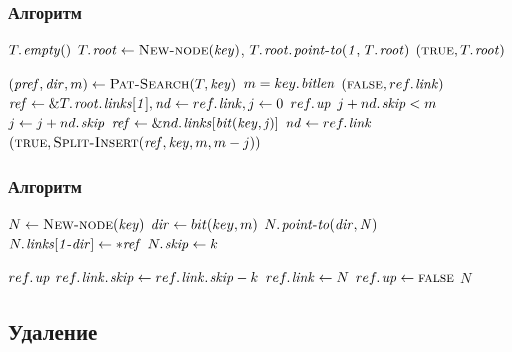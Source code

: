 \documentclass[hyperref={unicode=true}]{beamer}
\begin{document}
\frame
{
\frametitle{Алгоритм}
  \begin{codebox}
      \li \If $\attrib{T}{empty()}$
          \Then
      \li $\attrib{T}{root} \gets \proc{New-node}(\id{key})$, $\attribb{T}{root}{point-to(1, \attrib{T}{root})}$
      \li \Return $(\const{true}, \attrib{T}{root})$
          \End

      \li $(\id{pref}, \id{dir}, m) \gets \proc{Pat-Search}(T, \id{key})$
      \li \If $m \isequal \attrib{key}{bitlen}$
          \Then
      \li \Return $(\const{false}, \attrib{ref}{link})$
          \End
      \li $\id{ref} \gets \&\attribb{T}{root}{links[1]}, \id{nd} \gets \attrib{ref}{link}, j \gets 0$
      \li \While {} $\attrib{ref}{up}$  $j + \attrib{nd}{skip} < m$
            \Do
      \li       $j \gets j + \attrib{nd}{skip}$
      \li       $\id{ref} \gets \&\attrib{nd}{links[bit(\id{key}, j)]}$
      \li       $\id{nd} \gets \attrib{ref}{link}$
            \End
      \li  \Return $(\const{true}, \proc{Split-Insert}(\id{ref}, \id{key}, m, m-j))$
  \end{codebox}
}

\frame
{
\frametitle{Алгоритм}
  \begin{codebox}
      \li $N \gets \proc{New-node}(\id{key})$
      \li $\id{dir} \gets bit(key, m)$
      \li $\attrib{N}{point-to(dir, N)}$
      \li $\attrib{N}{links[1 - dir]} \gets *\id{ref}$
      \li $\attrib{N}{skip} \gets k$

      \li \If {} $\attrib{ref}{up}$
          \Then
      \li $\attribb{ref}{link}{skip} \gets \attribb{ref}{link}{skip} - k$
          \End
      \li $\attrib{ref}{link} \gets N$
      \li $\attrib{ref}{up} \gets \const{false}$
      \li \Return $N$
  \end{codebox}
}

\subsection{Удаление}

\end{document}
